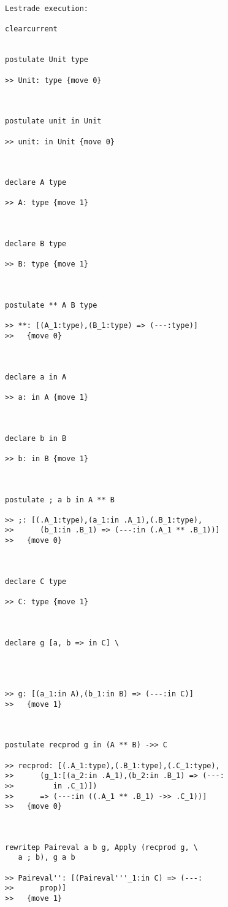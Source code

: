 \documentclass{article}
\begin{document}
\begin{verbatim}Lestrade execution:

clearcurrent


postulate Unit type

>> Unit: type {move 0}



postulate unit in Unit

>> unit: in Unit {move 0}



declare A type

>> A: type {move 1}



declare B type

>> B: type {move 1}



postulate ** A B type

>> **: [(A_1:type),(B_1:type) => (---:type)]
>>   {move 0}



declare a in A

>> a: in A {move 1}



declare b in B

>> b: in B {move 1}



postulate ; a b in A ** B

>> ;: [(.A_1:type),(a_1:in .A_1),(.B_1:type),
>>      (b_1:in .B_1) => (---:in (.A_1 ** .B_1))]
>>   {move 0}



declare C type

>> C: type {move 1}



declare g [a, b => in C] \
   



>> g: [(a_1:in A),(b_1:in B) => (---:in C)]
>>   {move 1}



postulate recprod g in (A ** B) ->> C

>> recprod: [(.A_1:type),(.B_1:type),(.C_1:type),
>>      (g_1:[(a_2:in .A_1),(b_2:in .B_1) => (---:
>>         in .C_1)])
>>      => (---:in ((.A_1 ** .B_1) ->> .C_1))]
>>   {move 0}



rewritep Paireval a b g, Apply (recprod g, \
   a ; b), g a b

>> Paireval'': [(Paireval'''_1:in C) => (---:
>>      prop)]
>>   {move 1}




\end{verbatim}
\end{document}
